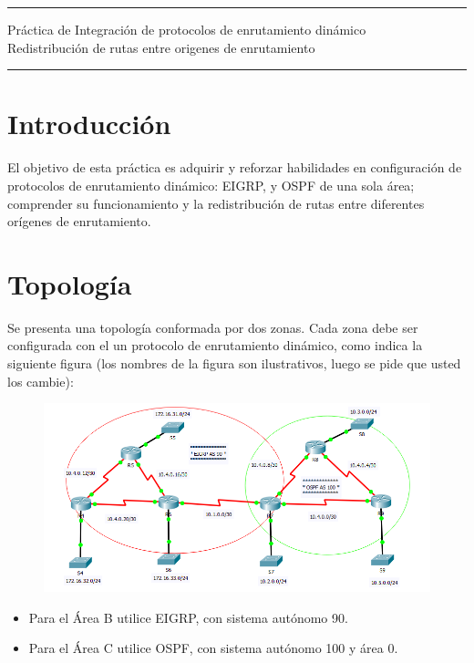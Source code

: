 \documentclass[12pt]{article}
\begin{document}

\begin{center}
\noindent\rule{\textwidth}{1pt}
\huge{Práctica de Integración de protocolos de enrutamiento dinámico}\\
\vspace{10px}
\small{Redistribución de rutas entre origenes de enrutamiento}
\noindent\rule{\textwidth}{1pt}
\end{center}

\section{Introducción} 
El objetivo de esta práctica es adquirir y reforzar habilidades en configuración de protocolos de enrutamiento dinámico: EIGRP, y OSPF de una sola área; comprender su funcionamiento y la redistribución de rutas entre diferentes orígenes de enrutamiento.

\section{Topología}
Se presenta una topología conformada por dos zonas. Cada zona debe ser configurada con el un protocolo de enrutamiento dinámico, como indica la siguiente figura (los nombres de la figura son ilustrativos, luego se pide que usted los cambie):

\begin{figure}[h]
\includegraphics[scale=0.9]{img_pr4.PNG}
\end{figure}

\begin{itemize}
\item Para el Área B utilice EIGRP, con sistema autónomo 90.
\item Para el Área C utilice OSPF, con sistema autónomo 100 y área 0.
\end{itemize}
\end{document}
